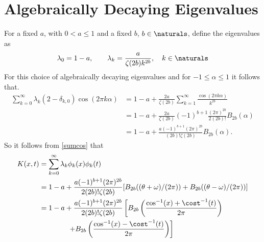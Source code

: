 \documentclass[]{elsarticle}
\theoremstyle{definition}
\begin{document}
\section{Algebraically Decaying Eigenvalues}
For a fixed $a$, with $0<a\le 1$ and a fixed $b$, $b \in \naturals$, define the eigenvalues as
\begin{equation}
\lambda_0=1-a, \qquad \lambda_k = \frac{a}{\zeta(2b)k^{2b}}, \quad k \in \naturals
\end{equation}
For this choice of algebraically decaying eigenvalues and for $-1 \le \alpha \le 1$ it follows that.
\begin{align*}
\sum_{k=0}^{\infty} \lambda_k (2-\delta_{k,0}) \cos(2 \pi k\alpha)
&= 1-a + \frac{2a}{\zeta(2b)}\sum_{k=1}^{\infty} \frac{\cos(2 \pi k\alpha)}{k^{2b}}\\
&= 1-a + \frac{2a}{\zeta(2b)} (-1)^{b+1} \frac{(2 \pi)^{2b}} {2 (2b)!} B_{2b}(\alpha) \\
&= 1-a + \frac{a (-1)^{b+1}(2 \pi)^{2b}}{(2b)!\zeta(2b)} B_{2b}(\alpha).
\end{align*}
So it follows from \eqref{sumcos} that
\begin{align*}
K(x,t) &= \sum_{k=0}^{\infty} \lambda_k \phi_k(x)\phi_k(t) \\
&= 1-a + \frac{a (-1)^{b+1}(2 \pi)^{2b}}{2(2b)!\zeta(2b)} [B_{2b}((\theta + \omega)/(2\pi)) + B_{2b}((\theta - \omega)/(2\pi))]\\
&= 1-a + \frac{a (-1)^{b+1}(2 \pi)^{2b}}{2(2b)!\zeta(2b)} \left[B_{2b}\left(\frac{\cos^{-1}(x) + \cost^{-1}(t)}{2\pi}\right) \right .  \\
& \qquad \qquad \left. + B_{2b}\left(\frac{\cos^{-1}(x) - \cost^{-1}(t)}{2\pi}\right) \right]
\end{align*}



\end{document}
